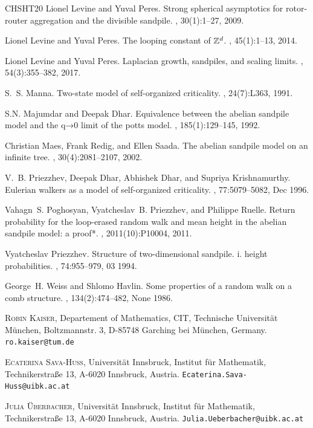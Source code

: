 \documentclass[11pt]{article}
\begin{document}
\begin{thebibliography}{CHSHT20}
Lionel Levine and Yuval Peres.
\newblock Strong spherical asymptotics for rotor-router aggregation and the divisible sandpile.
, 30(1):1--27, 2009.

Lionel Levine and Yuval Peres.
\newblock The looping constant of {$\Bbb Z^d$}.
, 45(1):1--13, 2014.

Lionel Levine and Yuval Peres.
\newblock Laplacian growth, sandpiles, and scaling limits.
, 54(3):355--382, 2017.

S.~S. Manna.
\newblock Two-state model of self-organized criticality.
, 24(7):L363, 1991.

S.N. Majumdar and Deepak Dhar.
\newblock Equivalence between the abelian sandpile model and the q→0 limit of the potts model.
, 185(1):129--145, 1992.

Christian Maes, Frank Redig, and Ellen Saada.
\newblock The abelian sandpile model on an infinite tree.
, 30(4):2081--2107, 2002.

V.~B. Priezzhev, Deepak Dhar, Abhishek Dhar, and Supriya Krishnamurthy.
\newblock Eulerian walkers as a model of self-organized criticality.
, 77:5079--5082, Dec 1996.

Vahagn~S. Poghosyan, Vyatcheslav~B. Priezzhev, and Philippe Ruelle.
\newblock Return probability for the loop-erased random walk and mean height in the abelian sandpile model: a proof*.
, 2011(10):P10004, 2011.

Vyatcheslav Priezzhev.
\newblock Structure of two-dimensional sandpile. i. height probabilities.
, 74:955--979, 03 1994.

George~H. Weiss and Shlomo Havlin.
\newblock Some properties of a random walk on a comb structure.
, 134(2):474--482, None 1986.

\end{thebibliography}




\textsc{Robin Kaiser}, Departement of Mathematics, CIT, Technische Universität München, Boltzmannstr. 3, D-85748 Garching bei München, Germany. \texttt{ro.kaiser@tum.de}

\textsc{Ecaterina Sava-Huss}, Universität Innsbruck, Institut für Mathematik, Technikerstraße 13,
A-6020 Innsbruck, Austria. \texttt{Ecaterina.Sava-Huss@uibk.ac.at}

\textsc{Julia Überbacher}, Universität Innsbruck, Institut für Mathematik, Technikerstraße 13,
A-6020 Innsbruck, Austria. \texttt{Julia.Ueberbacher@uibk.ac.at}
\end{document}
